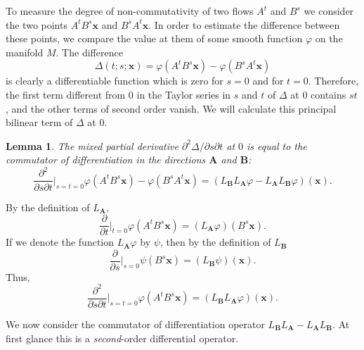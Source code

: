 \documentclass[leqno]{report}
\numberwithin{equation}{section}
\theoremstyle{plain}
\newtheorem{lem}[thm]{Lemma} %
\let\oldendproof\endproof
\renewenvironment{proof}[1][\proofname]{%
  \oldproof[\textsc{#1}]%
}{\oldendproof}
\theoremstyle{definition}
\theoremstyle{remark}
\theoremstyle{smallcap}
\numberwithin{prob}{section}
\begin{document}
To measure the degree of non-commutativity
of two flows $A^t$ and $B^s$ we consider the two points
$A^tB^s\mathbf x$ and $B^sA^t\mathbf x$.
%
In order to estimate the difference between these points,
we compare the value at them of some smooth function
$\varphi$ on the manifold $M$. The difference
$$
\Delta(t; s; \mathbf x)
=
\varphi(A^tB^s\mathbf x)
-
\varphi(B^sA^t\mathbf x)
$$
is clearly a differentiable function which is zero for $s = 0$
and for $t = 0$.
Therefore, the first term different from $0$ in the Taylor series
in $s$ and $t$ of $\Delta$ at $0$ contains $st$,
and the other terms of second order vanish.
%
We will calculate this principal bilinear term of $\Delta$ at $0$.


\begin{lem}
  The mixed partial derivative $\partial^2 \Delta/\partial s \partial t$ at $0$
  is equal to the commutator of differentiation in the directions
  $\mathbf A$ and $\mathbf B$:
  $$
  \frac{\partial^2}{\partial s \partial t}\bigg|_{s=t=0}
  {\varphi(A^tB^s\mathbf x) - \varphi(B^sA^t\mathbf x)}
  =
  (L_\mathbf{B} L_\mathbf{A} \varphi
  -L_\mathbf{A} L_\mathbf{B} \varphi)
  (\mathbf x).
  $$
\end{lem}

\begin{proof}
  By the definition of $L_\mathbf{A}$,
  $$
  \frac{\partial}{\partial t}\bigg|_{t=0}
  \varphi(A^tB^s\mathbf x)
  =
  (L_\mathbf{A} \varphi)(B^s\mathbf x).
  $$
  If we denote the function $L_\mathbf{A}\varphi$ by $\psi$,
  then by the definition of $L_\mathbf{B}$
  $$
  \frac{\partial}{\partial s}\bigg|_{s=0}
  \psi(B^s\mathbf x)
  =
  (L_\mathbf{B} \psi)(\mathbf x).
  $$
  Thus,
  $$
  \frac{\partial^2}{\partial s \partial t}\bigg|_{s=t=0}
  \varphi(A^tB^s\mathbf x)
  =
  (L_\mathbf{B} L_\mathbf{A} \varphi)(\mathbf x).
  $$
\end{proof}

We now consider the commutator of differentiation operator
$L_\mathbf{B} L_\mathbf{A} - L_\mathbf{A} L_\mathbf{B}$.
%
At first glance this is a \emph{second}-order differential operator.
\end{document}
